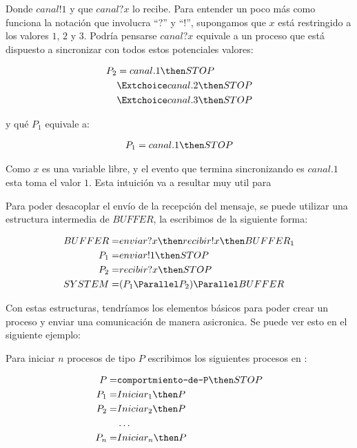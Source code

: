 Donde $canal!1$ y que $canal?x$ lo recibe. Para entender un poco más como funciona la notación que involucra ``$?$'' y ``$!$'', supongamos que $x$ está restringido a los valores $1$, $2$ y $3$. Podría pensarse $canal?x$ equivale a un proceso que está dispuesto a sincronizar con todos estos potenciales valores:

\begin{align*}
P_2 & =  canal.1 \then STOP \\
      & \Extchoice canal.2 \then STOP \\
      & \Extchoice canal.3 \then STOP 
\end{align*}

y qué $P_1$ equivale a: 

\begin{align*}
P_1  = canal.1 \then STOP \\
\end{align*}

Como $x$ es una variable libre, y el evento que termina sincronizando es $canal.1$ esta toma el valor $1$. Esta intuición va a resultar muy util para


Para poder desacoplar el envío de la recepción del mensaje, se puede utilizar una estructura intermedia de $BUFFER$, la escribimos de la siguiente forma:

\begin{align*}
BUFFER =& enviar?x \then recibir!x \then BUFFER_1 \\
P_1 =& enviar!1 \then STOP \\
P_2 =& recibir?x \then STOP \\
SYSTEM =& ( P_1 \Parallel P_2 ) \Parallel BUFFER \\
\end{align*}

Con estas estructuras, tendríamos los elementos básicos para poder crear un proceso y enviar una comunicación de manera asicronica. Se puede ver esto en el siguiente ejemplo:

Para iniciar $n$ procesos de tipo $P$ escribimos los siguientes procesos en \CSP:

\begin{align*}
P =& \texttt{comportmiento-de-P} \then STOP \\
P_1 =& Iniciar_1 \then P \\
P_2 =& Iniciar_2 \then P \\
&\ldots \\
P_n =& Iniciar_n \then P \\
\end{align*}

